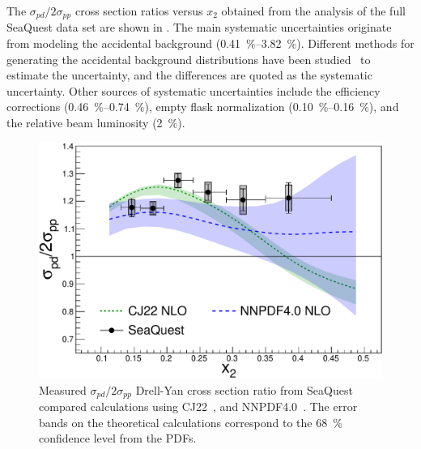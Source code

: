 \documentclass[reprint,aps,unsortedaddress,superscriptaddress,prl,floatfix,showpacs,linenumbers]{revtex4-2}
\begin{document}
The $\sigma_{pd}/2\sigma_{pp}$ cross
section ratios versus $x_2$ obtained from the analysis of the full SeaQuest
data set are shown in .
The main systematic uncertainties originate from modeling the
accidental background (\qtyrange{0.41}{3.82}{\percent}).
Different methods for generating the accidental background distributions
have been studied~\cite{pate2023} to estimate the uncertainty,
and the differences are quoted as the systematic uncertainty.
Other sources of systematic uncertainties include the efficiency
corrections (\qtyrange{0.46}{0.74}{\percent}),
empty flask normalization (\qtyrange{0.10}{0.16}{\percent}), and the
relative beam luminosity (\SI{2}{\percent}).

\begin{figure}[htbp!]
	\centering
	\includegraphics[width=\linewidth]{data_full_xT_syst.pdf}
	\caption{Measured $\sigma_{pd}/2\sigma_{pp}$ Drell-Yan cross section ratio from SeaQuest compared calculations using
		 CJ22~\cite{accardi2023}, and NNPDF4.0~\cite{ball2022a}.
		The error bands on the theoretical calculations correspond to the \SI{68}{\percent} confidence level from the PDFs.}
	\label{fig:xT_csr}
\end{figure}
\end{document}
